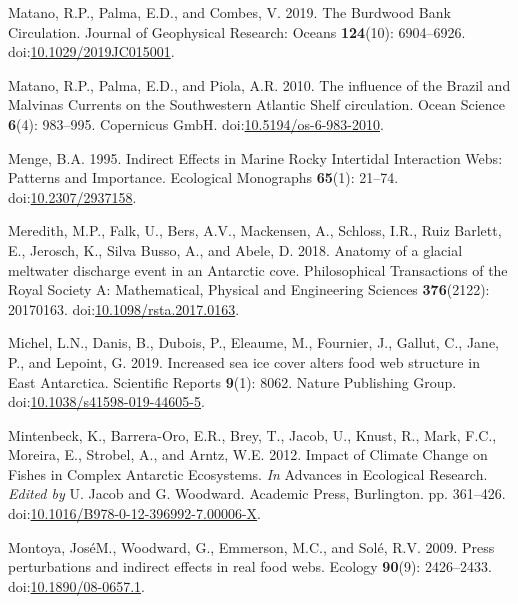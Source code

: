 \documentclass[
]{article}
\newlength{\cslhangindent}
\newenvironment{CSLReferences}[2] %
 {\begin{list}{}{%
  \setlength{\itemindent}{0pt}
  \setlength{\leftmargin}{0pt}
  \setlength{\parsep}{0pt}
  \ifodd #1
   \setlength{\leftmargin}{\cslhangindent}
   \setlength{\itemindent}{-1\cslhangindent}
  \fi
  \setlength{\itemsep}{#2\baselineskip}}}
 {\end{list}}
\begin{document}
\begin{CSLReferences}{1}{0}
Matano, R.P., Palma, E.D., and Combes, V. 2019. The {Burdwood Bank
Circulation}. Journal of Geophysical Research: Oceans \textbf{124}(10):
6904--6926.
doi:\href{https://doi.org/10.1029/2019JC015001}{10.1029/2019JC015001}.

Matano, R.P., Palma, E.D., and Piola, A.R. 2010. The influence of the
{Brazil} and {Malvinas Currents} on the {Southwestern Atlantic Shelf}
circulation. Ocean Science \textbf{6}(4): 983--995. Copernicus GmbH.
doi:\href{https://doi.org/10.5194/os-6-983-2010}{10.5194/os-6-983-2010}.

Menge, B.A. 1995. Indirect {Effects} in {Marine Rocky Intertidal
Interaction Webs}: {Patterns} and {Importance}. Ecological Monographs
\textbf{65}(1): 21--74.
doi:\href{https://doi.org/10.2307/2937158}{10.2307/2937158}.

Meredith, M.P., Falk, U., Bers, A.V., Mackensen, A., Schloss, I.R., Ruiz
Barlett, E., Jerosch, K., Silva Busso, A., and Abele, D. 2018. Anatomy
of a glacial meltwater discharge event in an {Antarctic} cove.
Philosophical Transactions of the Royal Society A: Mathematical,
Physical and Engineering Sciences \textbf{376}(2122): 20170163.
doi:\href{https://doi.org/10.1098/rsta.2017.0163}{10.1098/rsta.2017.0163}.

Michel, L.N., Danis, B., Dubois, P., Eleaume, M., Fournier, J., Gallut,
C., Jane, P., and Lepoint, G. 2019. Increased sea ice cover alters food
web structure in {East Antarctica}. Scientific Reports \textbf{9}(1):
8062. Nature Publishing Group.
doi:\href{https://doi.org/10.1038/s41598-019-44605-5}{10.1038/s41598-019-44605-5}.

Mintenbeck, K., Barrera-Oro, E.R., Brey, T., Jacob, U., Knust, R., Mark,
F.C., Moreira, E., Strobel, A., and Arntz, W.E. 2012. Impact of {Climate
Change} on {Fishes} in {Complex Antarctic Ecosystems}. \emph{In}
Advances in {Ecological Research}. \emph{Edited by} U. Jacob and G.
Woodward. Academic Press, Burlington. pp. 361--426.
doi:\href{https://doi.org/10.1016/B978-0-12-396992-7.00006-X}{10.1016/B978-0-12-396992-7.00006-X}.

Montoya, JoséM., Woodward, G., Emmerson, M.C., and Solé, R.V. 2009.
Press perturbations and indirect effects in real food webs. Ecology
\textbf{90}(9): 2426--2433.
doi:\href{https://doi.org/10.1890/08-0657.1}{10.1890/08-0657.1}.


\end{CSLReferences}
\end{document}
